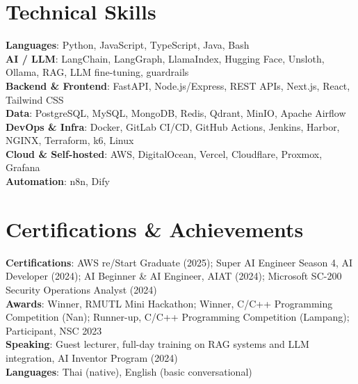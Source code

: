 \documentclass[11pt]{article}
\begin{document}
\section{Technical Skills}
 \begin{itemize}[leftmargin=0.15in, label={}]
    \small{\item{
     \textbf{Languages}{: Python, JavaScript, TypeScript, Java, Bash} \\
     \textbf{AI / LLM}{: LangChain, LangGraph, LlamaIndex, Hugging Face, Unsloth, Ollama, RAG, LLM fine-tuning, guardrails} \\
     \textbf{Backend \& Frontend}{: FastAPI, Node.js/Express, REST APIs, Next.js, React, Tailwind CSS} \\
     \textbf{Data}{: PostgreSQL, MySQL, MongoDB, Redis, Qdrant, MinIO, Apache Airflow} \\
     \textbf{DevOps \& Infra}{: Docker, GitLab CI/CD, GitHub Actions, Jenkins, Harbor, NGINX, Terraform, k6, Linux} \\
     \textbf{Cloud \& Self-hosted}{: AWS, DigitalOcean, Vercel, Cloudflare, Proxmox, Grafana} \\
     \textbf{Automation}{: n8n, Dify}
    }}
 \end{itemize}

\section{Certifications \& Achievements}
 \begin{itemize}[leftmargin=0.15in, label={}]
    \small{\item{
     \textbf{Certifications}{: AWS re/Start Graduate (2025); Super AI Engineer Season 4, AI Developer (2024);
       AI Beginner \& AI Engineer, AIAT (2024); Microsoft SC-200 Security Operations Analyst (2024)} \\
     \textbf{Awards}{: Winner, RMUTL Mini Hackathon; Winner, C/C++ Programming Competition (Nan);
       Runner-up, C/C++ Programming Competition (Lampang); Participant, NSC 2023} \\
     \textbf{Speaking}{: Guest lecturer, full-day training on RAG systems and LLM integration, AI Inventor Program (2024)} \\
     \textbf{Languages}{: Thai (native), English (basic conversational)}
    }}
 \end{itemize}
\end{document}
